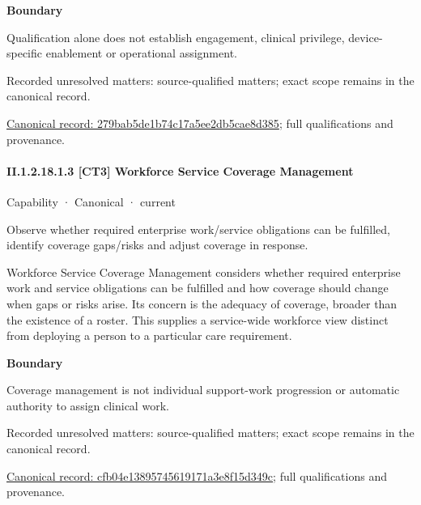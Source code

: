 \textbf{Boundary}



Qualification alone does not establish engagement, clinical privilege, device-specific enablement or operational assignment.


{\small Recorded unresolved matters: source-qualified matters; exact scope remains in the canonical record.}\par
{\footnotesize \href{../../../../../../../continuum/strategy/capability/279bab5de1b74c17a5ee2db5cae8d385.md}{Canonical record: 279bab5de1b74c17a5ee2db5cae8d385}; full qualifications and provenance.}\par
\paragraph*{II.1.2.18.1.3 [CT3] Workforce Service Coverage Management}
\label{navigation:II.1.2.18.1.3}

\label{element:cfb04e13895745619171a3e8f15d349c}
{\small Capability · Canonical · current}\par

Observe whether required enterprise work/service obligations can be fulfilled, identify coverage gaps/risks and adjust coverage in response.



Workforce Service Coverage Management considers whether required enterprise work and service obligations can be fulfilled and how coverage should change when gaps or risks arise. Its concern is the adequacy of coverage, broader than the existence of a roster. This supplies a service-wide workforce view distinct from deploying a person to a particular care requirement.



\textbf{Boundary}



Coverage management is not individual support-work progression or automatic authority to assign clinical work.


{\small Recorded unresolved matters: source-qualified matters; exact scope remains in the canonical record.}\par
{\footnotesize \href{../../../../../../../continuum/strategy/capability/cfb04e13895745619171a3e8f15d349c.md}{Canonical record: cfb04e13895745619171a3e8f15d349c}; full qualifications and provenance.}\par
